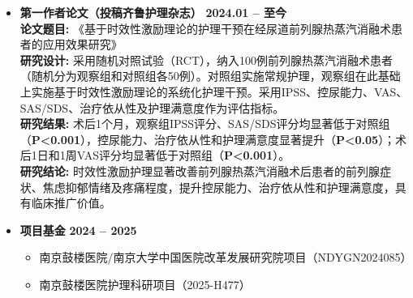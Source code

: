 \documentclass[zh]{resume}
\begin{document}
\begin{itemize}
        \item
        \textbf{第一作者论文（投稿齐鲁护理杂志）} \hfill \textbf{2024.01 -- 至今}
          \\
        \textbf{论文题目: } 《基于时效性激励理论的护理干预在经尿道前列腺热蒸汽消融术患者的应用效果研究》
        \\
        \textbf{研究设计: } 采用随机对照试验（RCT），纳入100例前列腺热蒸汽消融术患者（随机分为观察组和对照组各50例）。对照组实施常规护理，观察组在此基础上实施基于时效性激励理论的系统化护理干预。采用IPSS、控尿能力、VAS、SAS/SDS、治疗依从性及护理满意度作为评估指标。
        \\
        \textbf{研究结果: } 术后1个月，观察组IPSS评分、SAS/SDS评分均显著低于对照组（\textbf{P<0.001}），控尿能力、治疗依从性和护理满意度显著提升（\textbf{P<0.05}）；术后1日和1周VAS评分均显著低于对照组（\textbf{P<0.001}）。
        \\
        \textbf{研究结论: } 时效性激励护理显著改善前列腺热蒸汽消融术后患者的前列腺症状、焦虑抑郁情绪及疼痛程度，提升控尿能力、治疗依从性和护理满意度，具有临床推广价值。

        \item
        \textbf{项目基金} \hfill \textbf{2024 -- 2025}
        \begin{itemize}
            \item 南京鼓楼医院/南京大学中国医院改革发展研究院项目（NDYGN2024085）
            \item 南京鼓楼医院护理科研项目（2025-H477）
        \end{itemize}
\end{itemize}


\end{document}
